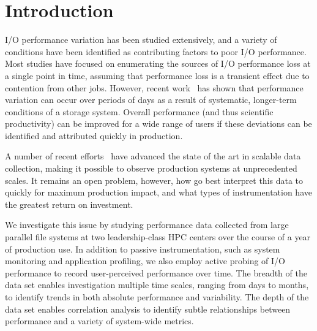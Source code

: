 \section{Introduction}

I/O performance variation has been studied extensively, and a variety of conditions have been identified as contributing factors to poor I/O performance.  Most studies have focused on enumerating the sources of I/O performance loss at a single point in time, assuming that performance loss is a transient effect due to contention from other jobs.  However, recent work~\cite{Lockwood2017} has shown that performance variation can occur over periods of days as a result of systematic, longer-term conditions of a storage system.
%
Overall performance (and thus scientific productivity) can be improved for a
wide range of users if these deviations can be identified and attributed
quickly in production.


A number of recent efforts~\cite{Lockwood2017,Vazhkudai2017guide,Agelastos2014ldms,Kunkel2014siox} have advanced the
state of the art in scalable data collection, making it possible to observe
production systems at unprecedented scales.  It remains an open problem,
however, how go best interpret this data to quickly for maximum production
impact, and what types of instrumentation have the greatest return on
investment.

We investigate this issue by studying performance data collected
from large parallel file systems at two leadership-class HPC centers
over the course of a year of production use.  In addition to passive
instrumentation, such as system monitoring and application profiling,
we also employ active probing of I/O performance to record user-perceived
performance over time.  The breadth of the data set enables investigation
multiple time scales, ranging from days to months, to identify trends in
both absolute performance and variability.  The depth of the data set
enables correlation analysis to identify subtle relationships between
performance and a variety of system-wide metrics.


